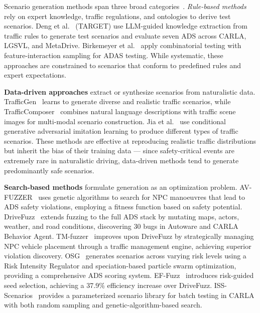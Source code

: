 Scenario generation methods span three broad categories~\cite{wang_survey_2024, riedmaier_survey_2020, tang_survey_2023}. \textit{Rule-based methods} rely on expert knowledge, traffic regulations, and ontologies to derive test scenarios. Deng et al.~\cite{deng_target_2025} (TARGET) use LLM-guided knowledge extraction from traffic rules to generate test scenarios and evaluate seven ADS across CARLA, LGSVL, and MetaDrive. Birkemeyer et al.~\cite{birkemeyer_feature-interaction_2022} apply combinatorial testing with feature-interaction sampling for ADAS testing. While systematic, these approaches are constrained to scenarios that conform to predefined rules and expert expectations.

\textbf{Data-driven approaches} extract or synthesize scenarios from naturalistic data. TrafficGen~\cite{feng_trafficgen_2023} learns to generate diverse and realistic traffic scenarios, while TrafficComposer~\cite{tu_multi-modal_2025} combines natural language descriptions with traffic scene images for multi-modal scenario construction. Jia et al.~\cite{ji_effuzz_2023} use conditional generative adversarial imitation learning to produce different types of traffic scenarios. These methods are effective at reproducing realistic traffic distributions but inherit the bias of their training data --- since safety-critical events are extremely rare in naturalistic driving, data-driven methods tend to generate predominantly safe scenarios.

\textbf{Search-based methods} formulate generation as an optimization problem. AV-FUZZER~\cite{li_av-fuzzer_2020} uses genetic algorithms to search for NPC manoeuvres that lead to ADS safety violations, employing a fitness function based on safety potential. DriveFuzz~\cite{kim_drivefuzz_2022} extends fuzzing to the full ADS stack by mutating maps, actors, weather, and road conditions, discovering 30 bugs in Autoware and CARLA Behavior Agent. TM-fuzzer~\cite{lin_tm-fuzzer_2024} improves upon DriveFuzz by strategically managing NPC vehicle placement through a traffic management engine, achieving superior violation discovery. OSG~\cite{yan_-demand_2025} generates scenarios across varying risk levels using a Risk Intensity Regulator and speciation-based particle swarm optimization, providing a comprehensive ADS scoring system. EF-Fuzz~\cite{ji_effuzz_2023} introduces risk-guided seed selection, achieving a 37.9\% efficiency increase over DriveFuzz. ISS-Scenarios~\cite{li_iss-scenario_2024} provides a parameterized scenario library for batch testing in CARLA with both random sampling and genetic-algorithm-based search.

